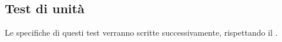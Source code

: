 	\subsection{Test di unità}
	 	Le specifiche di questi test verranno scritte successivamente, rispettando il .

